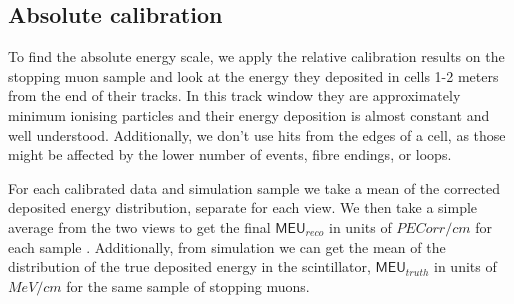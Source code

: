 

\subsection{Absolute calibration}

To find the absolute energy scale, we apply the relative calibration results on the stopping muon sample and look at the energy they deposited in cells 1-2 meters from the end of their tracks. In this track window they are approximately minimum ionising particles and their energy deposition is almost constant and well understood. Additionally, we don't use hits from the edges of a cell, as those might be affected by the lower number of events, fibre endings, or loops. 

For each calibrated data and simulation sample we take a mean of the corrected deposited energy distribution, separate for each view. We then take a simple average from the two views to get the final $\textsf{MEU}_{reco}$ in units of $\unit{PECorr/cm}$ for each sample \cite{NOVA-doc-13579-FACalorimetricEnergyScale}. Additionally, from simulation we can get the mean of the distribution of the true deposited energy in the scintillator, $\textsf{MEU}_{truth}$ in units of $\unit{MeV/cm}$ for the same sample of stopping muons. 

